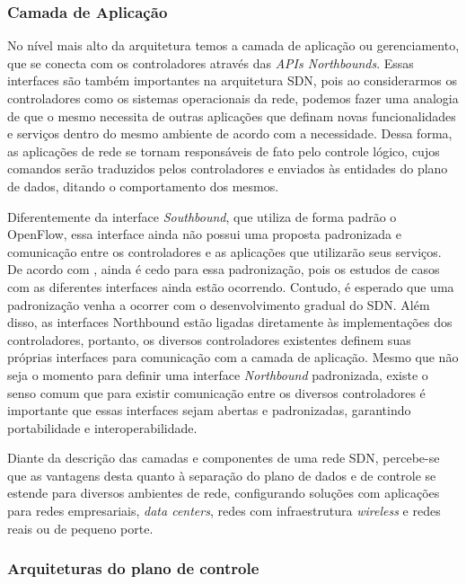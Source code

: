 \subsubsection{Camada de Aplicação}

No nível mais alto da arquitetura temos a camada de aplicação ou gerenciamento, que se conecta com os controladores através das \emph{APIs Northbounds}. Essas interfaces são também importantes na arquitetura SDN, pois ao considerarmos os controladores como os sistemas operacionais da rede, podemos fazer uma analogia de que o mesmo necessita de outras aplicações que definam novas funcionalidades e serviços dentro do mesmo ambiente de acordo com a necessidade. Dessa forma, as aplicações de rede se tornam responsáveis de fato pelo controle lógico, cujos comandos serão traduzidos pelos controladores e enviados às entidades do plano de dados, ditando o comportamento dos mesmos.\cite{Nunes}
       
       Diferentemente da interface \emph{Southbound}, que utiliza de forma padrão o OpenFlow, essa interface ainda não possui uma proposta padronizada e comunicação entre os controladores e as aplicações que utilizarão seus serviços. De acordo com  , ainda é cedo para essa padronização, pois os estudos de casos com as diferentes interfaces ainda estão ocorrendo. Contudo, é esperado que uma padronização venha a ocorrer com o desenvolvimento gradual do SDN. Além disso, as interfaces Northbound estão ligadas diretamente às implementações dos controladores, portanto, os diversos controladores existentes definem suas próprias interfaces para comunicação com a camada de aplicação. Mesmo que não seja o momento para definir uma interface \emph{Northbound} padronizada, existe o senso comum que para existir comunicação entre os diversos controladores é importante que essas interfaces sejam abertas e padronizadas, garantindo portabilidade e interoperabilidade. 
     

  
\par Diante da descrição das camadas e componentes de uma rede SDN, percebe-se que as vantagens desta quanto à separação do plano de dados e de controle se estende para diversos ambientes de rede, configurando soluções com aplicações para redes empresariais, \emph{data centers}, redes com infraestrutura \emph{wireless} e redes reais ou de pequeno porte.\cite{Nunes}

\subsubsection{Arquiteturas do plano de controle }

